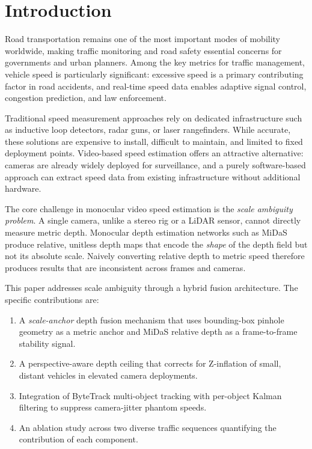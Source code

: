 \documentclass[conference]{IEEEtran}
\begin{document}
\section{Introduction}

Road transportation remains one of the most important modes of
mobility worldwide, making traffic monitoring and road safety
essential concerns for governments and urban planners. Among
the key metrics for traffic management, vehicle speed is
particularly significant: excessive speed is a primary
contributing factor in road accidents, and real-time speed
data enables adaptive signal control, congestion prediction,
and law enforcement.

Traditional speed measurement approaches rely on dedicated
infrastructure such as inductive loop detectors, radar guns,
or laser rangefinders. While accurate, these solutions are
expensive to install, difficult to maintain, and limited to
fixed deployment points. Video-based speed estimation offers
an attractive alternative: cameras are already widely deployed
for surveillance, and a purely software-based approach can
extract speed data from existing infrastructure without
additional hardware.

The core challenge in monocular video speed estimation is the
\emph{scale ambiguity problem}. A single camera, unlike a
stereo rig or a LiDAR sensor, cannot directly measure metric
depth. Monocular depth estimation networks such as MiDaS
\cite{ranftl2022midas} produce relative, unitless depth maps
that encode the \emph{shape} of the depth field but not its
absolute scale. Naively converting relative depth to metric
speed therefore produces results that are inconsistent across
frames and cameras.

This paper addresses scale ambiguity through a hybrid fusion
architecture. The specific contributions are:
\begin{enumerate}
  \item A \emph{scale-anchor} depth fusion mechanism that uses
        bounding-box pinhole geometry as a metric anchor and
        MiDaS relative depth as a frame-to-frame stability
        signal.
  \item A perspective-aware depth ceiling that corrects for
        Z-inflation of small, distant vehicles in elevated
        camera deployments.
  \item Integration of ByteTrack \cite{zhang2022bytetrack}
        multi-object tracking with per-object Kalman filtering
        \cite{khodarahmi2023kalman} to suppress camera-jitter
        phantom speeds.
  \item An ablation study across two diverse traffic sequences
        quantifying the contribution of each component.
\end{enumerate}
\end{document}
